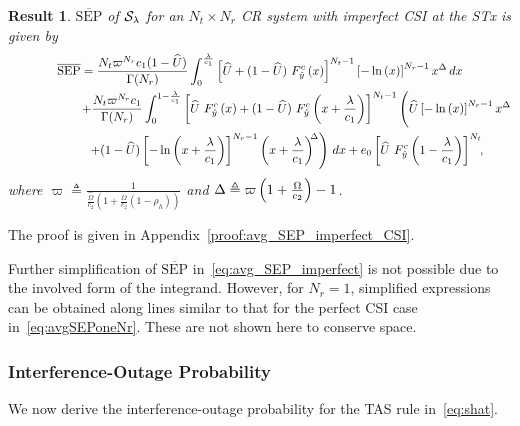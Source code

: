 \documentclass[12pt,draftcls,peerreview,onecolumn]{IEEEtran}
\newtheorem{result}{{\bf Result}}
\newcommand{\define}{\triangleq}
\newcommand{\SEP}{\text{SEP}}
\newcommand{\lam}{\lambda}
\newcommand{\Nt}{{N_t}}
\newcommand{\Nr}{{N_r}}
\newcommand{\cone}{c_{1}}
\newcommand{\ctwo}{c_{2}}
\newcommand{\lambym}{\frac{\lam}{\cone}}
\newcommand{\al}{\ctwo}
\newcommand{\snr}{\Omega}
\newcommand{\snrbyal}[1][]{\frac{\snr#1}{\al}}
\newcommand{\un}{U}
\newcommand{\zerosep}{e_0}
\newcommand{\callamrule}{{\cal S_{{\lam}}}}
\newcommand{\avgSEP}{\overline{\SEP}}
\newcommand{\unhat}{\widehat{\un}}
\newcommand{\snrhat}{\widehat{\snr}}
\newcommand{\snrhatbyal}[1][]{\frac{\snrhat#1}{\al}}
\newcommand{\rhoh}{\rho_h}
\newcommand{\Tc}{\frac{1}{\snrhatbyal\left(1 + \snrbyal\left(1 - \rhoh \right)  \right) }}
\newcommand{\T}{\varpi}
\newcommand{\Dc}{\T \left( 1 + \snrbyal\right) -1}
\begin{document}
\begin{result}
\label{thm:avg_SEP_imperfect}
$\avgSEP$ of $\callamrule$ for an $\Nt\times\Nr$ CR system with imperfect CSI at the STx is given by
\begin{multline}
\label{eq:avg_SEP_imperfect}
\avgSEP = \frac{\Nt \T^{\Nr}\cone(1-\unhat)}{\Gamma(\Nr)} \int_{0}^{\lambym} \left[\unhat + \unccdfyhat{(1-\unhat)}{x}\right]^{\Nt-1} \yhattimespdfyNr\, dx\\
\hspace{60pt} + \frac{\Nt \T^{\Nr}\cone}{\Gamma(\Nr)} \int_{0}^{1-\lambym}
\left[\unccdfyhat{\unhat}{x} + \unccdfyhat{(1-\unhat)}{x+\lambym} \right]^{\Nt-1} \Bigg(\unhat\yhattimespdfyNr  \\ 
\hspace{40pt}\left. + (1-\unhat)\yhatpluslamtimespdfyNr\right)\, dx 
+\zerosep\left[\unccdfyhat{\unhat}{1-\lambym}\right]^{\Nt}\!\!,\!\!
\end{multline}
where $\T \define \Tc$ and $\D \define \Dc$.	
\end{result}
\begin{IEEEproof}
	The proof is given in Appendix~\ref{proof:avg_SEP_imperfect_CSI}.
\end{IEEEproof}

Further simplification of $\avgSEP$ in~\eqref{eq:avg_SEP_imperfect} is not possible due to the involved form of the integrand. However, for $\Nr=1$, simplified expressions can be obtained along lines similar to that for the perfect CSI case in~\eqref{eq:avgSEPoneNr}. These are not shown here to conserve space.



\subsubsection{ Interference-Outage Probability} We now derive the interference-outage probability for the TAS rule in~\eqref{eq:shat}.
\end{document}
